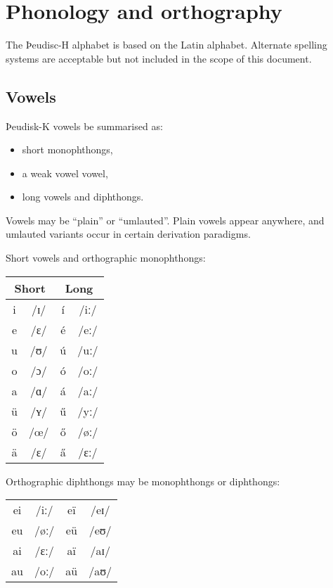 \section{Phonology and orthography}

The Þeudisc-H alphabet is based on the Latin alphabet. Alternate spelling systems are acceptable but not included in the scope of this document.

\subsection{Vowels}

Þeudisk-K vowels be summarised as:

\begin{itemize}
\item short monophthongs,
\item a weak vowel vowel,
\item long vowels and diphthongs.
\end{itemize}

Vowels may be ``plain'' or ``umlauted''. Plain vowels appear anywhere, and umlauted variants occur in certain derivation paradigms.

Short vowels and orthographic monophthongs:

\begin{center}
\begin{tabular}{cc|cc}
\multicolumn{2}{c}{Short} &
\multicolumn{2}{c}{Long} \\
\hline
i & /ɪ/ & í & /iː/ \\
e & /ɛ/ & é & /eː/ \\
u & /ʊ/ & ú & /uː/ \\
o & /ɔ/ & ó & /oː/ \\
a & /ɑ/ & á & /aː/ \\
ü & /ʏ/ & \H{u} & /yː/ \\
ö & /œ/ & \H{o} & /øː/ \\
ä & /ɛ/ & \H{a} & /ɛː/ \\
\end{tabular}
\end{center}

Orthographic diphthongs may be monophthongs or diphthongs:

\begin{center}
\begin{tabular}{cc|cc}
ei & /iː/ & eï & /eɪ/ \\
eu & /øː/ & eü & /eʊ/ \\
ai & /ɛː/ & aï & /aɪ/ \\
au & /oː/ & aü & /aʊ/  \\
\end{tabular}
\end{center}

